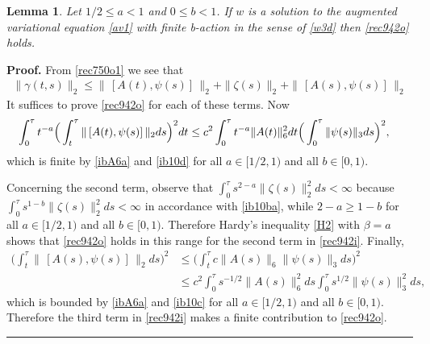 \documentclass[12pt]{article}
\newtheorem{lemma}[theorem]{Lemma}
\newenvironment{proof}[1][Proof]{\textbf{#1.} }{\ \rule{0.5em}{0.5em}}
\def \({\Big(}
\def \){\Big)}
\def \eref{\eqref}
\numberwithin{equation}{section}
\begin{document}
       \begin{lemma}\label{lemrec9o}Let $1/2 \le a <1$ and $0 \le b <1$. 
    If $w$ is a solution to the augmented variational equation \eref{av1} with 
       finite b-action in the sense  of \eref{w3d} 
       then  \eref{rec942o} holds.
\end{lemma}
         \begin{proof}
From \eref{rec750o1} we see that 
\begin{align}
\| \gamma(t,s)\|_2 \le   \|\, [A(t), \psi(s)]\,\|_2 + \|\zeta(s)\|_2 +\|\, [A(s), \psi(s)]\, \|_2 \label{rec942i}
\end{align}
It suffices to prove \eref{rec942o} for each of these terms. Now  
 \begin{align}
 \int_0^\tau t^{-a}\( \int_t^\tau \|\, [A(t), \psi(s)]\,\|_2 ds\)^2 dt 
&\le c^2 \int_0^\tau t^{-a}\|A(t)\|_6^2 dt \(\int_0^\tau \|\psi(s)\|_3 ds \)^2,   \notag
 \end{align}
 which is finite by \eref{ibA6a} and  \eref{ib10d} for all $a \in [1/2, 1)$ and all $b \in [0, 1)$.
      
         Concerning the second term, observe that $\int_0^\tau s^{2-a} \|\zeta(s)\|_2^2 ds < \infty$
because $\int_0^\tau s^{1-b} \|\zeta(s)\|_2^2 ds < \infty$ in accordance with \eref{ib10ba}, while
$2-a \ge 1-b$ for all $a \in [1/2, 1)$ and all $b \in [0, 1)$. Therefore Hardy's inequality 
\eref{H2} with $\beta =a$ shows that
\eref{rec942o} holds in this range for the second term in \eref{rec942i}.
Finally,
   \begin{align*}
   \(\int_t^\tau\|\, [A(s), \psi(s)]\,\|_2ds\)^2 &\le \(\int_t^\tau c \|A(s)\|_6 \|\psi(s)\|_3ds \)^2 \\
   &\le c^2\int_0^\tau s^{-1/2} \|A(s)\|_6^2 ds \int_0^\tau s^{1/2}\|\psi(s)\|_3^2 ds, 
   \end{align*}
   which is bounded by \eref{ibA6a} and \eref{ib10c} for all $a \in [1/2, 1)$ and all $b \in [0, 1)$.
   Therefore the third term in \eref{rec942i} makes a finite contribution to \eref{rec942o}.
\end{proof}
\end{document}
